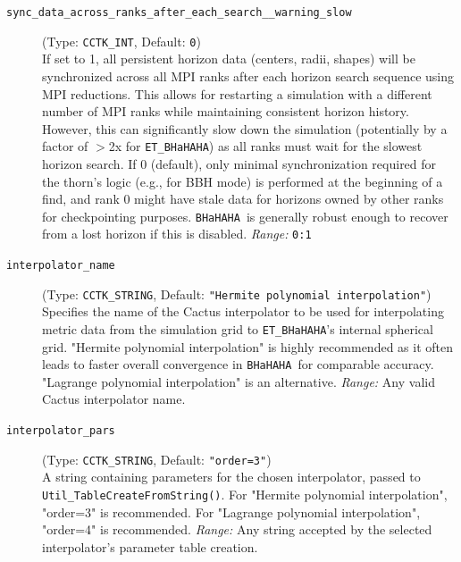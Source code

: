 \documentclass[a4paper,11pt]{article}
\newcommand{\thorn}[1]{{\tt #1}}
\newcommand{\BHaHAHA}{\thorn{ET\_BHaHAHA}} %
\newcommand{\bhahlib}{\texttt{BHaHAHA}} %
\begin{document}
\begin{description}
    \item[\texttt{sync\_data\_across\_ranks\_after\_each\_search\_\_warning\_slow}] (Type: \texttt{CCTK\_INT}, Default: \texttt{0}) \\
        If set to 1, all persistent horizon data (centers, radii, shapes) will be synchronized across all MPI ranks after each horizon search sequence using MPI reductions. This allows for restarting a simulation with a different number of MPI ranks while maintaining consistent horizon history. However, this can significantly slow down the simulation (potentially by a factor of $>$2x for \BHaHAHA) as all ranks must wait for the slowest horizon search. If 0 (default), only minimal synchronization required for the thorn's logic (e.g., for BBH mode) is performed at the beginning of a find, and rank 0 might have stale data for horizons owned by other ranks for checkpointing purposes. \bhahlib\ is generally robust enough to recover from a lost horizon if this is disabled.
        \textit{Range:} \texttt{0:1}

    \item[\texttt{interpolator\_name}] (Type: \texttt{CCTK\_STRING}, Default: \texttt{"Hermite polynomial interpolation"}) \\
        Specifies the name of the Cactus interpolator to be used for interpolating metric data from the simulation grid to \BHaHAHA's internal spherical grid. "Hermite polynomial interpolation" is highly recommended as it often leads to faster overall convergence in \bhahlib\ for comparable accuracy. "Lagrange polynomial interpolation" is an alternative.
        \textit{Range:} Any valid Cactus interpolator name.

    \item[\texttt{interpolator\_pars}] (Type: \texttt{CCTK\_STRING}, Default: \texttt{"order=3"}) \\
        A string containing parameters for the chosen interpolator, passed to \texttt{Util\_TableCreateFromString()}. For "Hermite polynomial interpolation", "order=3" is recommended. For "Lagrange polynomial interpolation", "order=4" is recommended.
        \textit{Range:} Any string accepted by the selected interpolator's parameter table creation.
\end{description}
\end{document}
